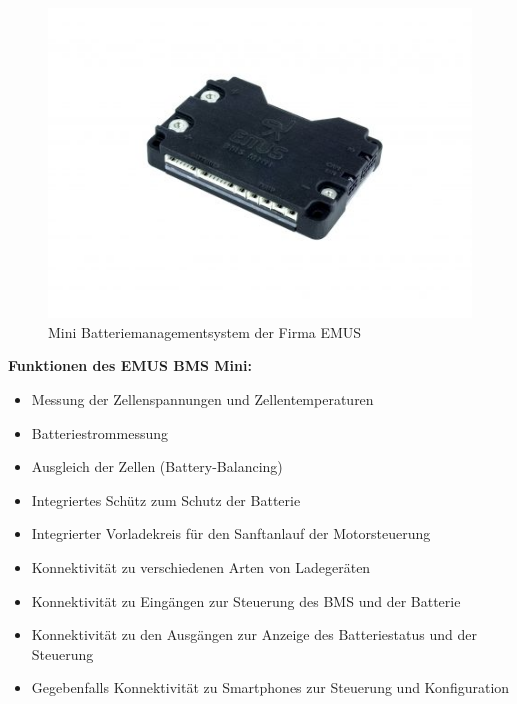 \begin{figure}[H]
	\begin{center}
		\includegraphics[scale=0.9]{figures/Akku/BMSMINI.jpg}
		\caption{Mini Batteriemanagementsystem der Firma EMUS}
	\end{center}
\end{figure}

\textbf{Funktionen des EMUS BMS Mini:}
\begin{itemize}
\item {Messung der Zellenspannungen und Zellentemperaturen} 
\item {Batteriestrommessung}
\item {Ausgleich der Zellen (Battery-Balancing)}
\item {Integriertes Schütz zum Schutz der Batterie}
\item {Integrierter Vorladekreis für den Sanftanlauf der Motorsteuerung}
\item {Konnektivität zu verschiedenen Arten von Ladegeräten}
\item {Konnektivität zu Eingängen zur Steuerung des BMS und der Batterie}
\item {Konnektivität zu den Ausgängen zur Anzeige des Batteriestatus und der Steuerung}
\item {Gegebenfalls Konnektivität zu Smartphones zur Steuerung und Konfiguration}
\end{itemize}

